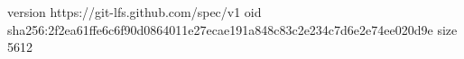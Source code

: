 version https://git-lfs.github.com/spec/v1
oid sha256:2f2ea61ffe6c6f90d0864011e27ecae191a848c83c2e234c7d6e2e74ee020d9e
size 5612
